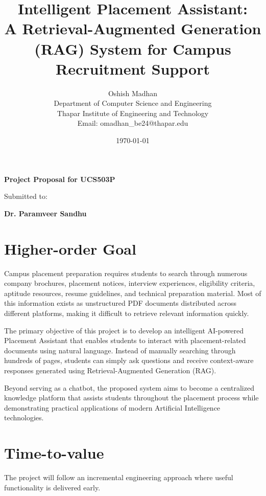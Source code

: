 \documentclass[11pt]{article}
\title{\textbf{Intelligent Placement Assistant: \\ A Retrieval-Augmented Generation (RAG) System for Campus Recruitment Support}}
\author{
Oshish Madhan\\
Department of Computer Science and Engineering\\
Thapar Institute of Engineering and Technology\\
Email: omadhan\_be24@thapar.edu
}
\date{\today}
\begin{document}
\maketitle

\begin{center}
\textbf{Project Proposal for UCS503P}

\vspace{0.2cm}

Submitted to:

\textbf{Dr. Paramveer Sandhu}
\end{center}

\section{Higher-order Goal}

Campus placement preparation requires students to search through numerous company brochures, placement notices, interview experiences, eligibility criteria, aptitude resources, resume guidelines, and technical preparation material. Most of this information exists as unstructured PDF documents distributed across different platforms, making it difficult to retrieve relevant information quickly.

The primary objective of this project is to develop an intelligent AI-powered Placement Assistant that enables students to interact with placement-related documents using natural language. Instead of manually searching through hundreds of pages, students can simply ask questions and receive context-aware responses generated using Retrieval-Augmented Generation (RAG).

Beyond serving as a chatbot, the proposed system aims to become a centralized knowledge platform that assists students throughout the placement process while demonstrating practical applications of modern Artificial Intelligence technologies.

\section{Time-to-value}

The project will follow an incremental engineering approach where useful functionality is delivered early.
\end{document}

